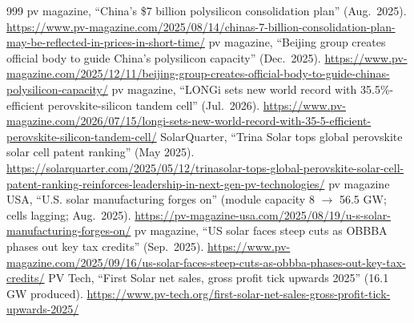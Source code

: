 \begin{thebibliography}{999}
 pv magazine, ``China's \$7 billion polysilicon consolidation plan'' (Aug.\ 2025). \url{https://www.pv-magazine.com/2025/08/14/chinas-7-billion-consolidation-plan-may-be-reflected-in-prices-in-short-time/}
 pv magazine, ``Beijing group creates official body to guide China's polysilicon capacity'' (Dec.\ 2025). \url{https://www.pv-magazine.com/2025/12/11/beijing-group-creates-official-body-to-guide-chinas-polysilicon-capacity/}
 pv magazine, ``LONGi sets new world record with 35.5\%-efficient perovskite-silicon tandem cell'' (Jul.\ 2026). \url{https://www.pv-magazine.com/2026/07/15/longi-sets-new-world-record-with-35-5-efficient-perovskite-silicon-tandem-cell/}
 SolarQuarter, ``Trina Solar tops global perovskite solar cell patent ranking'' (May 2025). \url{https://solarquarter.com/2025/05/12/trinasolar-tops-global-perovskite-solar-cell-patent-ranking-reinforces-leadership-in-next-gen-pv-technologies/}
 pv magazine USA, ``U.S. solar manufacturing forges on'' (module capacity 8 $\rightarrow$ 56.5 GW; cells lagging; Aug.\ 2025). \url{https://pv-magazine-usa.com/2025/08/19/u-s-solar-manufacturing-forges-on/}
 pv magazine, ``US solar faces steep cuts as OBBBA phases out key tax credits'' (Sep.\ 2025). \url{https://www.pv-magazine.com/2025/09/16/us-solar-faces-steep-cuts-as-obbba-phases-out-key-tax-credits/}
 PV Tech, ``First Solar net sales, gross profit tick upwards 2025'' (16.1 GW produced). \url{https://www.pv-tech.org/first-solar-net-sales-gross-profit-tick-upwards-2025/}


\end{thebibliography}

